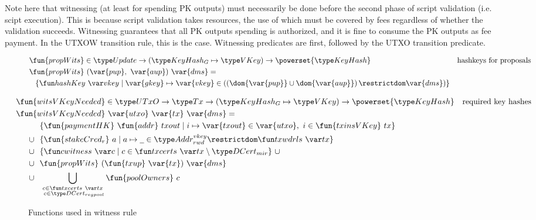 Note here that witnessing (at least for spending PK outputs) must necessarily
be done before the second phase of script validation (i.e. scipt execution).
This is because script validation takes resources, the use of which must
be covered by fees regardless of whether the validation succeeds. Witnessing
guarantees that all PK outputs spending is authorized, and it is fine to
consume the PK outputs as fee payment. In the UTXOW transition rule,
this is the case. Witnessing predicates are first, followed by the UTXO transition
predicate.

\begin{figure}[htb]
  \begin{align*}
    & \fun{propWits} \in \Update \to (\KeyHashGen\mapsto\VKey) \to \powerset{\KeyHash}
    & \text{hashkeys for proposals} \\
    & \fun{propWits}~(\var{pup},~\var{aup})~\var{dms} = \\
    & ~~\left\{
      \hashKey{vkey}
      \mid
      \var{gkey}\mapsto\var{vkey}\in
      \left(\left(\dom{\var{pup}}\cup\dom{\var{aup}}\right)\restrictdom\var{dms}\right)
      \right\}
  \end{align*}

    \begin{align*}
    & \hspace{-0.8cm}\fun{witsVKeyNeeded} \in \UTxO \to \Tx \to (\KeyHashGen\mapsto\VKey) \to
      \powerset{\KeyHash}
    & \text{required key hashes} \\
    &  \hspace{-0.8cm}\fun{witsVKeyNeeded}~\var{utxo}~\var{tx}~\var{dms} = \\
    & ~~\{ \fun{paymentHK}~\fun{addr}~{txout} \mid i \mapsto \var{txout} \in \var{utxo},~i\in\fun{txinsVKey}~{tx} \} \\
    \cup & ~~
           \{\fun{stakeCred_r}~a\mid a\mapsto \wcard \in \AddrRWDVKey
      \restrictdom \txwdrls{tx}\}\\
    \cup & ~~\{\cwitness{c} \mid c \in \txcerts{tx} \setminus \DCertMir\}~\cup \\
    \cup & ~~\fun{propWits}~(\fun{txup}~\var{tx})~\var{dms} \\
    \cup & ~~\bigcup_{\substack{c \in \txcerts{tx} \\ ~c \in\DCertRegPool}} \fun{poolOwners}~{c}
  \end{align*}
  \caption{Functions used in witness rule}
  \label{fig:functions-witnesses}
\end{figure}


